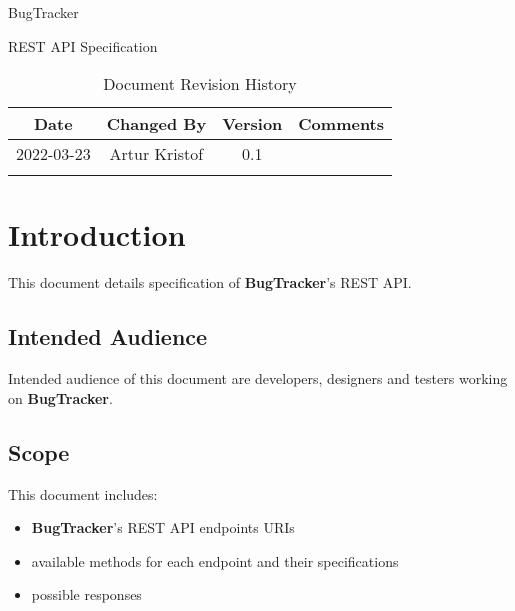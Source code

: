 \documentclass[a4paper]{article}
\newcommand{\appName}{BugTracker}
\newcommand{\appNameBold}{\textbf{BugTracker}}
\begin{document}
    \begin{titlepage}
        \vspace*{\fill}
        \begin{center}
            \huge
            \appName{}

            \vspace{0.4cm}
            \Huge
            REST API Specification

            \vspace{3cm}
            \begin{table}[h]
                \centering
                \caption{Document Revision History}
                \begin{tabular}{cccc}
                    \hline
                    Date & Changed By & Version & Comments \\
                    \hline
                    2022-03-23 & Artur Kristof & 0.1 & \hfill \\
                    \hfill & \hfill & \hfill & \hfill \\
                    \hline
                \end{tabular}
            \end{table}
        \end{center}
        \vspace*{\fill}
    \end{titlepage}

    \tableofcontents

    \section{Introduction}
    This document details specification of \appNameBold{}'s REST API.

    \subsection{Intended Audience}
    Intended audience of this document are developers, designers and testers working on \appNameBold{}.

    \subsection{Scope}
    This document includes:
    \begin{itemize}
        \item \appNameBold{}'s REST API endpoints URIs
        \item available methods for each endpoint and their specifications
        \item possible responses
    \end{itemize}
\end{document}
